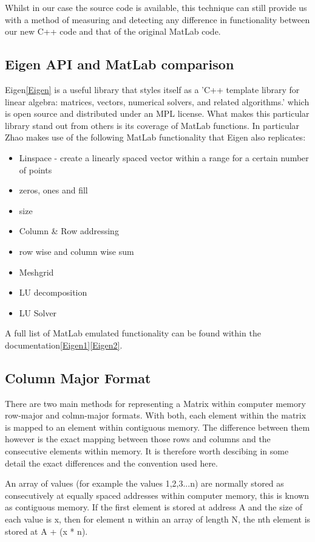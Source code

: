 \documentclass[a4paper]{amsart}
\begin{document}
Whilst in our case the source code is available, this technique can still provide us with a method of measuring and detecting any difference in functionality between our new C++ code and that of the original MatLab code.



\subsection{Eigen API and MatLab comparison}
Eigen\ref{Eigen} is a useful library that styles itself as a 'C++ template library for linear algebra: matrices, vectors, numerical solvers, and related algorithms.' which is open source and distributed under an MPL license. What makes this particular library stand out from others is its coverage of MatLab functions. In particular Zhao makes use of the following MatLab functionality that Eigen also replicates:

\begin{itemize}
\item Linspace - create a linearly spaced vector within a range for a certain number of points
\item zeros, ones and fill
\item size
\item Column \& Row addressing
\item row wise and column wise sum
\item Meshgrid
\item LU decomposition
\item LU Solver
\end{itemize}

A full list of MatLab emulated functionality can be found within the documentation\ref{Eigen1}\ref{Eigen2}.

\subsection{Column Major Format}\label{CMF}
There are two main methods for representing a Matrix within computer memory row-major and colmn-major formats. With both, each element within the matrix is mapped to an element within contiguous memory. The difference between them however is the exact mapping between those rows and columns and the consecutive elements within memory. It is therefore worth descibing in some detail the exact differences and the convention used here.

An array of values (for example the values 1,2,3...n) are normally stored as consecutively at equally spaced addresses within computer memory, this is known as contiguous memory. If the first element is stored at address A and the size of each value is x, then for element n within an array of length N, the nth element is stored at A + (x * n).
\end{document}
